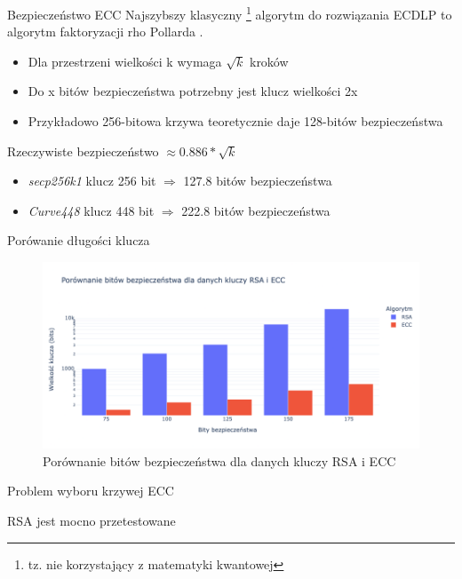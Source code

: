 \begin{frame}{Bezpieczeństwo ECC}
Najszybszy klasyczny \footnote{tz. nie korzystający z matematyki kwantowej} algorytm do rozwiązania ECDLP to algorytm faktoryzacji rho Pollarda \cite{SolvingECDLP}.
\begin{itemize}
    \item Dla przestrzeni wielkości k wymaga $\sqrt{k}$ kroków
    \item Do x bitów bezpieczeństwa potrzebny jest klucz wielkości 2x
    \item Przykładowo 256-bitowa krzywa teoretycznie daje 128-bitów bezpieczeństwa
\end{itemize}
\pause
Rzeczywiste bezpieczeństwo $\approx 0.886*\sqrt{k}$
\pause
\begin{itemize}
    \item \textit{secp256k1} klucz 256 bit $\Rightarrow$ 127.8 bitów bezpieczeństwa \cite{Secp256k1Security}
    \item \textit{Curve448} klucz 448 bit $\Rightarrow$ 222.8 bitów bezpieczeństwa \cite{Secp256k1Security}
\end{itemize}

\end{frame}

\begin{frame}{Porówanie długości klucza}
    \begin{figure}
        \centering
            \includegraphics[width=\textwidth]{security/graphics/Porównanie bitów bezpieczeństwa dla danych kluczy RSA i ECC}
            \caption{Porównanie bitów bezpieczeństwa dla danych kluczy RSA i ECC}
    \end{figure}
\end{frame}

\begin{frame}{Problem wyboru krzywej ECC}
\end{frame}

\begin{frame}{RSA jest mocno przetestowane}
\end{frame}
